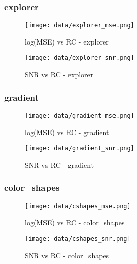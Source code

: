 \documentclass[12pt,a4paper]{article}
\begin{document}
\subsubsection{explorer}
\begin{minipage}{0.5\textwidth}
        \centering
        \begin{figure}[H]
    \centering
    \texttt{[image: data/explorer\_mse.png]}
    \caption{log(MSE) vs RC - explorer}
    
\end{figure}
\end{minipage}\hfill
    \begin{minipage}{0.5\textwidth}
        \centering
        \begin{figure}[H]
    \centering
    \texttt{[image: data/explorer\_snr.png]}
    \caption{SNR vs RC - explorer}
    
\end{figure}
\end{minipage}
\subsubsection{gradient}
\begin{minipage}{0.5\textwidth}
        \centering
        \begin{figure}[H]
    \centering
    \texttt{[image: data/gradient\_mse.png]}
    \caption{log(MSE) vs RC - gradient}
    
\end{figure}
\end{minipage}\hfill
    \begin{minipage}{0.5\textwidth}
        \centering
        \begin{figure}[H]
    \centering
    \texttt{[image: data/gradient\_snr.png]}
    \caption{SNR vs RC - gradient}
    
\end{figure}
\end{minipage}
\subsubsection{color\_shapes}
\begin{minipage}{0.5\textwidth}
        \centering
        \begin{figure}[H]
    \centering
    \texttt{[image: data/cshapes\_mse.png]}
    \caption{log(MSE) vs RC - color\_shapes}
    
\end{figure}
\end{minipage}\hfill
    \begin{minipage}{0.5\textwidth}
        \centering
        \begin{figure}[H]
    \centering
    \texttt{[image: data/cshapes\_snr.png]}
    \caption{SNR vs RC - color\_shapes}
    
\end{figure}
\end{minipage}
\end{document}
